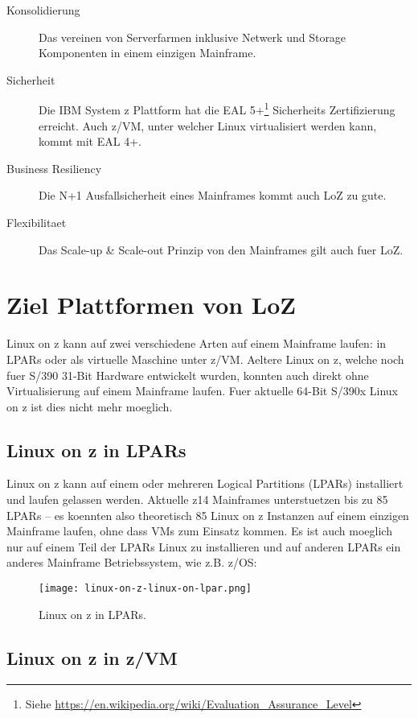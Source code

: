 \begin{description}
    \item[Konsolidierung]{Das vereinen von Serverfarmen inklusive Netwerk und Storage Komponenten in einem einzigen Mainframe.}
    \item[Sicherheit]{Die IBM System z Plattform hat die EAL 5+\footnote{Siehe \url{https://en.wikipedia.org/wiki/Evaluation_Assurance_Level}} Sicherheits Zertifizierung erreicht. Auch z/VM, unter welcher Linux virtualisiert werden kann, kommt mit EAL 4+.}
    \item[Business Resiliency]{Die N+1 Ausfallsicherheit eines Mainframes kommt auch LoZ zu gute.}
    \item[Flexibilitaet]{Das Scale-up \& Scale-out Prinzip von den Mainframes gilt auch fuer LoZ.}
\end{description}

\section{Ziel Plattformen von LoZ}

Linux on z kann auf zwei verschiedene Arten auf einem Mainframe laufen: in LPARs oder als virtuelle Maschine unter z/VM. Aeltere Linux on z, welche noch fuer S/390 31-Bit Hardware entwickelt wurden, konnten auch direkt ohne Virtualisierung auf einem Mainframe laufen.
Fuer aktuelle 64-Bit S/390x Linux on z ist dies nicht mehr moeglich.

\subsection{Linux on z in LPARs}

Linux on z kann auf einem oder mehreren Logical Partitions (LPARs) installiert und laufen gelassen werden. Aktuelle z14 Mainframes unterstuetzen bis zu 85 LPARs -- es koennten also theoretisch 85 Linux on z Instanzen auf einem einzigen Mainframe laufen, ohne dass VMs zum Einsatz kommen.
Es ist auch moeglich nur auf einem Teil der LPARs Linux zu installieren und auf anderen LPARs ein anderes Mainframe Betriebssystem, wie z.B. z/OS:

\begin{figure}[h!]
\centering
\texttt{[image: linux-on-z-linux-on-lpar.png]}
\caption{Linux on z in LPARs\cite{LinuxOnZOnLPAR}.}
\label{fig:LinuxOnZOnLPAR}
\end{figure}

\subsection{Linux on z in z/VM}

